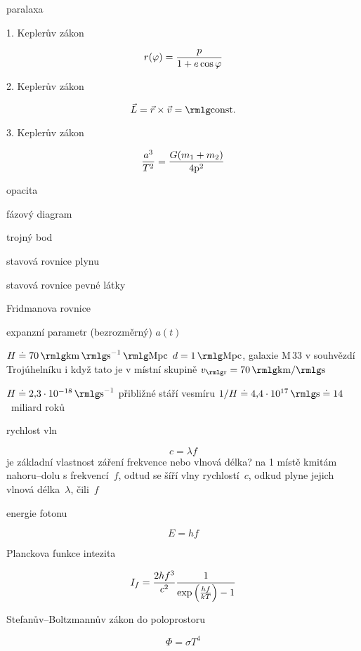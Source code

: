 paralaxa

1. Keplerův zákon

$$r(\varphi) = {p\over 1+e\cos\varphi}$$

2. Keplerův zákon

$$\vec L = \vec r\times\vec v = {\rm const.}$$

3. Keplerův zákon

$${a^3\over T^2} = {G(m_1+m_2)\over 4\pi^2}$$

opacita

fázový diagram

trojný bod

stavová rovnice plynu

stavová rovnice pevné látky

Fridmanova rovnice

expanzní parametr (bezrozměrný)
$a(t)$

$H \doteq 70\,{\rm km}\,{\rm s}^{-1}\,{\rm Mpc}$
$d = 1\,{\rm Mpc}$,
galaxie M\,33 v souhvězdí Trojúhelníku
i když tato je v místní skupině
$v_{\rm r} = 70\,{\rm km}/{\rm s}$


$H \doteq 2{,}3\cdot10^{-18}\,{\rm s}^{-1}$
přibližné stáří vesmíru
$1/H \doteq 4{,}4\cdot10^{17}\,{\rm s} \doteq 14$~miliard roků

rychlost vln

$$c = \lambda f$$
je základní vlastnost záření frekvence nebo vlnová délka?
na 1 místě kmitám nahoru--dolu s frekvencí~$f$,
odtud se šíří vlny rychlostí~$c$,
odkud plyne jejich vlnová délka~$\lambda$,
čili~$f$

energie fotonu

$$E = hf$$

Planckova funkce
intezita

$$I_f = {2hf^3\over c^2}{1\over\exp\left({hf\over kT}\right)-1}$$

Stefanův--Boltzmannův zákon
do poloprostoru

$$\Phi = \sigma T^4$$






\bye

